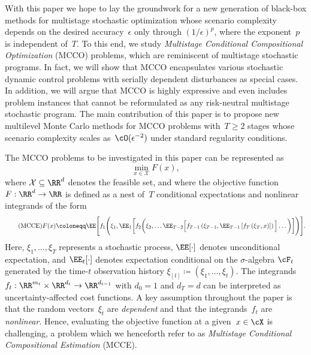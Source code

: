 \documentclass[11pt]{article}
\begin{document}
With this paper we hope to lay the groundwork for a new generation of black-box methods for multistage stochastic optimization whose scenario complexity depends on the desired accuracy~$\epsilon$ only through $(1/\epsilon)^p$, where the exponent~$p$ is independent of~$T$. To this end, we study \emph{Multistage Conditional Compositional Optimization} (MCCO) problems, which are reminiscent of multistage stochastic programs. In fact, we will show that MCCO encapsulates various stochastic dynamic control problems with serially dependent disturbances as special cases. In addition, we will argue that MCCO is highly expressive and even includes problem instances that cannot be reformulated as any risk-neutral multistage stochastic program. The main contribution of this paper is to propose new multilevel Monte Carlo methods for MCCO problems with~$T\geq 2$ stages whose scenario complexity scales as~$\cO(\epsilon^{-2})$ under standard regularity conditions.

The MCCO problems to be investigated in this paper can be represented as
\begin{equation}
\tag{MCCO}
    	\label{problem:MCCO}
    	\min_{x\in\mathcal{X}}  F(x),
\end{equation}
where $\mathcal{X}\subseteq\RR^{d}$ denotes the feasible set, and where the objective function $F:\RR^d\rightarrow\RR$ is defined as a nest of~$T$ conditional expectations and nonlinear integrands of the form
\begin{equation}
    \tag{MCCE}
    \label{problem:MCCE} 
    F(x) \coloneqq \EE \Bigg[f_1\Bigg(\xi_1,\EE_{1} \bigg[f_2\bigg(\xi_2,\ldots \EE_{T-2} \Big[f_{T-1}\left(\xi_{T-1},\EE_{T-1} \left[f_T\left(\xi_T,x\right)\right]\right)\Big]\ldots\bigg) \bigg]\Bigg)\Bigg].
\end{equation}
Here, $\xi_1,\ldots,\xi_T$ represents a stochastic process, $\EE[\cdot]$ denotes unconditional expectation, and $\EE_{t}[\cdot]$ denotes expectation conditional on the $\sigma$-algebra $\cF_t$ generated by the time-$t$ observation history $\xi_{[t]} \coloneqq (\xi_1,...,\xi_{t})$. The integrands $f_t:\RR^{m_t}\times\RR^{d_t}\rightarrow \RR^{d_{t-1}}$ with $d_0=1$ and $d_T=d$ can be interpreted as uncertainty-affected cost functions. A key assumption throughout the paper is that the random vectors~$\xi_t$ are {\em dependent} and that the integrands~$f_t$ are {\em nonlinear}. Hence, evaluating the objective function at a given~$x\in\cX$ is challenging, a problem which we henceforth refer to as \emph{Multistage Conditional Compositional Estimation} (MCCE).
\end{document}

